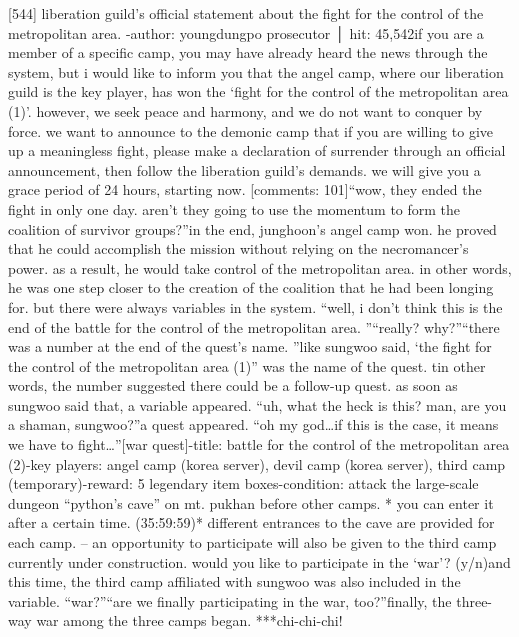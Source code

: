 [544] liberation guild’s official statement about the fight for the control of the metropolitan area.
-author: youngdungpo prosecutor │ hit: 45,542if you are a member of a specific camp, you may have already heard the news through the system, but i would like to inform you that the angel camp, where our liberation guild is the key player, has won the ‘fight for the control of the metropolitan area (1)’.
however, we seek peace and harmony, and we do not want to conquer by force.
we want to announce to the demonic camp that if you are willing to give up a meaningless fight, please make a declaration of surrender through an official announcement, then follow the liberation guild’s demands.
 we will give you a grace period of 24 hours, starting now.
[comments: 101]“wow, they ended the fight in only one day.
 aren’t they going to use the momentum to form the coalition of survivor groups?”in the end, junghoon’s angel camp won.
 he proved that he could accomplish the mission without relying on the necromancer’s power.
 as a result, he would take control of the metropolitan area.
 in other words, he was one step closer to the creation of the coalition that he had been longing for.
but there were always variables in the system.
“well, i don’t think this is the end of the battle for the control of the metropolitan area.
”“really? why?”“there was a number at the end of the quest’s name.
”like sungwoo said, ‘the fight for the control of the metropolitan area (1)” was the name of the quest.
 tin other words, the number suggested there could be a follow-up quest.
as soon as sungwoo said that, a variable appeared.
“uh, what the heck is this? man, are you a shaman, sungwoo?”a quest appeared.
“oh my god…if this is the case, it means we have to fight…”[war quest]-title: battle for the control of the metropolitan area (2)-key players: angel camp (korea server), devil camp (korea server), third camp (temporary)-reward: 5 legendary item boxes-condition: attack the large-scale dungeon “python’s cave” on mt.
 pukhan before other camps.
* you can enter it after a certain time.
 (35:59:59)* different entrances to the cave are provided for each camp.
– an opportunity to participate will also be given to the third camp currently under construction.
would you like to participate in the ‘war’? (y/n)and this time, the third camp affiliated with sungwoo was also included in the variable.
“war?”“are we finally participating in the war, too?”finally, the three-way war among the three camps began.
***chi-chi-chi!

